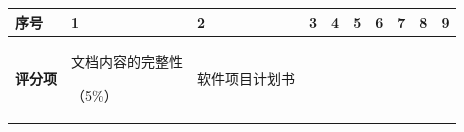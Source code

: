 \documentclass[
]{article}
\begin{document}
\begin{longtable}[]{@{}
  >{\centering\arraybackslash}p{}
  >{\centering\arraybackslash}p{}
  >{\centering\arraybackslash}p{}
  >{\centering\arraybackslash}p{}
  >{\centering\arraybackslash}p{}
  >{\centering\arraybackslash}p{}
  >{\centering\arraybackslash}p{}
  >{\centering\arraybackslash}p{}
  >{\centering\arraybackslash}p{}
  >{\centering\arraybackslash}p{}@{}}
\toprule\noalign{}
\begin{minipage}[b]{\linewidth}\centering
\textbf{序号}
\end{minipage} & \begin{minipage}[b]{\linewidth}\centering
\textbf{1}
\end{minipage} & \begin{minipage}[b]{\linewidth}\centering
\textbf{2}
\end{minipage} & \begin{minipage}[b]{\linewidth}\centering
\textbf{3}
\end{minipage} & \begin{minipage}[b]{\linewidth}\centering
\textbf{4}
\end{minipage} & \begin{minipage}[b]{\linewidth}\centering
\textbf{5}
\end{minipage} & \begin{minipage}[b]{\linewidth}\centering
\textbf{6}
\end{minipage} & \begin{minipage}[b]{\linewidth}\centering
\textbf{7}
\end{minipage} & \begin{minipage}[b]{\linewidth}\centering
\textbf{8}
\end{minipage} & \begin{minipage}[b]{\linewidth}\centering
\textbf{9}
\end{minipage} \\
\midrule\noalign{}
\endhead
\bottomrule\noalign{}
\endlastfoot
\textbf{评分项} & 文档内容的完整性

（5\%） & 软件项目计划书


\end{longtable}
\end{document}
